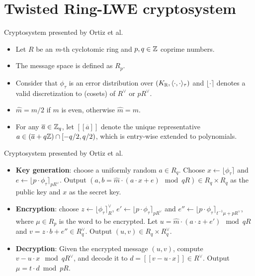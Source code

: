 \documentclass[notheorems, bigger]{beamer}
\begin{document}
\section{Twisted Ring-LWE cryptosystem}
\label{sec:orgb553f6f}
\begin{frame}[label={sec:org66bce8d}]{Cryptosystem presented by Ortiz et al.}
\begin{itemize}
\item Let \(R\) be an \emph{m}-th cyclotomic ring and \(p, q \in \mathbb{Z}\) coprime numbers.
\item The message space is defined as \(R_p\).
\item Consider that \(\phi_\tau\) is an error distribution over \((K_{\mathbb{R}},\langle{\cdot,\cdot}\rangle_\tau)\) and \(\lfloor{\cdot}\rceil\) denotes a valid discretization to (cosets) of \(R^\vee\) or \(pR^\vee\).
\item \(\hat{m} = m/2\) if \(m\) is even, otherwise \(\hat{m} = m\).
\item For any \(\overline{a} \in \mathbb{Z}_q\), let \([[\overline{a}]]\) denote the unique representative \(a \in (\overline{a} + q\mathbb{Z}) \cap [-q/2, q/2)\), which is entry-wise extended to polynomials.
\end{itemize}
\end{frame}
\begin{frame}[label={sec:orgcda9158}]{Cryptosystem presented by Ortiz et al.}
 \begin{itemize}
\item \textbf{Key generation}: choose a uniformly random $a \in R_q$. Choose $x
  \longleftarrow \lfloor{\phi_\tau}\rceil$ and $e \longleftarrow \lfloor{p \cdot \phi_\tau}\rceil_{pR^\vee}$. Output $(a,b = \hat{m}\cdot(a \cdot x + e)
  \mod{qR} ) \in R_q \times R_q$ as the public key and $x$ as the secret key.
\item \textbf{Encryption}: choose $z \longleftarrow  \lfloor{\phi_\tau}\rceil_R^\vee$, $e' \longleftarrow \lfloor{p \cdot
    \phi_\tau}\rceil_{pR^\vee}$ and  $e'' \longleftarrow \lfloor{p \cdot \phi_\tau}\rceil_{t^{-1}\mu +pR^\vee}$, where $\mu \in R_p$ is
  the word to be encrypted. Let $u = \hat{m} \cdot (a \cdot z + e') \mod{qR}$ and $v =
  z \cdot b + e'' \in R_q^\vee$. Output $(u,v) \in R_q \times R^\vee_q$.
\item \textbf{Decryption}: Given the encrypted message $(u,v)$, compute $v - u
  \cdot x \mod{qR^\vee}$, and decode it to $d = [[v - u \cdot x]] \in R^\vee$. Output $\mu = t \cdot
  d \bmod{pR}$. 
\end{itemize}
\end{frame}
\end{document}

